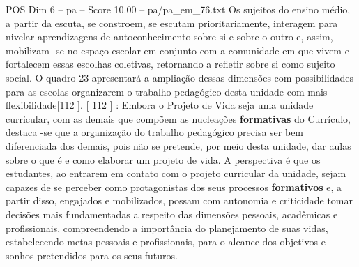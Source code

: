 \begin{textsample}{POS Dim 6 – pa – Score 10.00 – pa/pa\_em\_76.txt}
Os sujeitos do ensino médio, a partir da escuta, se constroem, se escutam prioritariamente, interagem para nivelar aprendizagens de autoconhecimento sobre si e sobre o outro e, assim, mobilizam -se no espaço escolar em conjunto com a comunidade em que vivem e fortalecem essas escolhas coletivas, retornando a refletir sobre si como sujeito social.
O quadro 23 apresentará a ampliação dessas dimensões com possibilidades para as escolas organizarem o trabalho pedagógico desta unidade com mais flexibilidade[112 ]. [ 112 ] : Embora o Projeto de Vida seja uma unidade curricular, com as demais que compõem as nucleações \textbf{formativas} do Currículo, destaca -se que a organização do trabalho pedagógico precisa ser bem diferenciada dos demais, pois não se pretende, por meio desta unidade, dar aulas sobre o que é e como elaborar um projeto de vida.
A perspectiva é que os estudantes, ao entrarem em contato com o projeto curricular da unidade, sejam capazes de se perceber como protagonistas dos seus processos \textbf{formativos} e, a partir disso, engajados e mobilizados, possam com autonomia e criticidade tomar decisões mais fundamentadas a respeito das dimensões pessoais, acadêmicas e profissionais, compreendendo a importância do planejamento de suas vidas, estabelecendo metas pessoais e profissionais, para o alcance dos objetivos e sonhos pretendidos para os seus futuros.

\end{textsample}

